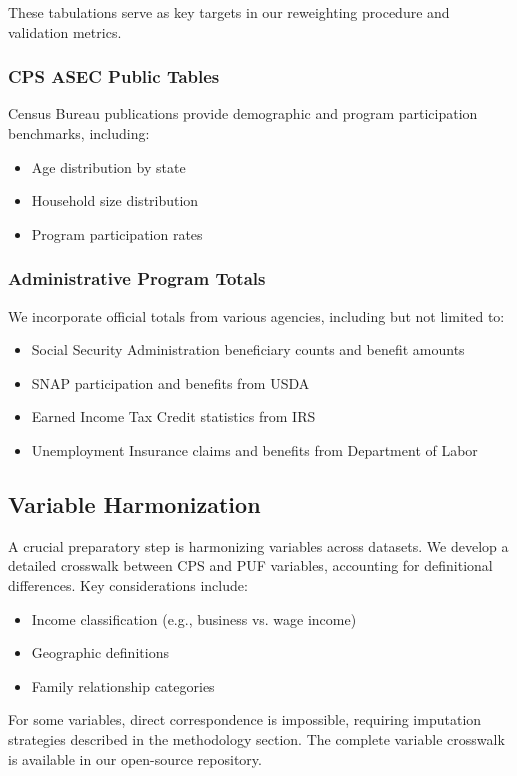 These tabulations serve as key targets in our reweighting procedure and validation metrics.

\subsubsection{CPS ASEC Public Tables}

Census Bureau publications provide demographic and program participation benchmarks, including:
\begin{itemize}
    \item Age distribution by state
    \item Household size distribution
    \item Program participation rates
\end{itemize}

\subsubsection{Administrative Program Totals}

We incorporate official totals from various agencies, including but not limited to:
\begin{itemize}
    \item Social Security Administration beneficiary counts and benefit amounts
    \item SNAP participation and benefits from USDA
    \item Earned Income Tax Credit statistics from IRS
    \item Unemployment Insurance claims and benefits from Department of Labor
\end{itemize}

\subsection{Variable Harmonization}

A crucial preparatory step is harmonizing variables across datasets. We develop a detailed crosswalk between CPS and PUF variables, accounting for definitional differences. Key considerations include:
\begin{itemize}
    \item Income classification (e.g., business vs. wage income)
    \item Geographic definitions
    \item Family relationship categories
\end{itemize}

For some variables, direct correspondence is impossible, requiring imputation strategies described in the methodology section. The complete variable crosswalk is available in our open-source repository.